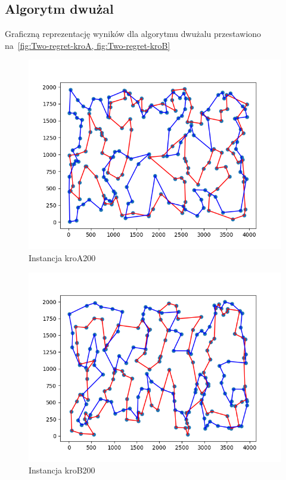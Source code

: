 \documentclass[11pt]{article}
\begin{document}
\subsection{Algorytm dwużal}\label{subsec:algorytm-dwużal}
Graficzną reprezentację wyników dla algorytmu dwużalu przestawiono na~\ref{fig:Two-regret-kroA, fig:Two-regret-kroB}
\begin{figure}[H]
    \centering
    \includegraphics{best_paths/two_regret_kroA200.tsp.png}
    \caption{Instancja kroA200}
    \label{fig:Two-regret-kroA}
\end{figure}
\begin{figure}[H]
    \centering
    \includegraphics{best_paths/two_regret_kroB200.tsp.png}
    \caption{Instancja kroB200}
    \label{fig:Two-regret-kroB}
\end{figure}
\end{document}
